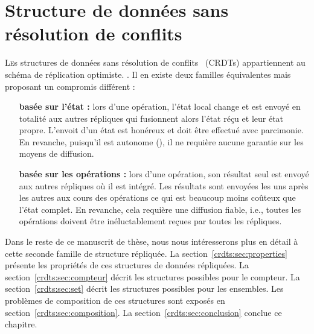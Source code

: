 
\chapter{Structure de données sans résolution de conflits}

\minitoc

\lettrine{L}es structures de données sans résolution de
conflits~\cite{shapiro2011comprehensive} (CRDTs) appartiennent au schéma de
réplication optimiste. .  Il en existe deux
familles équivalentes mais proposant un compromis différent :
\begin{itemize}
\item [\textbf{basée sur l'état :}] lors d'une opération, l'état local change et
  est envoyé en totalité aux autres répliques qui fusionnent alors l'état réçu
  et leur état propre. L'envoit d'un état est honéreux et doit être effectué
  avec parcimonie. En revanche, puisqu'il est autonome
  (), il ne requière aucune garantie sur les moyens
  de diffusion.
\item [\textbf{basée sur les opérations :}] lors d'une opération, son résultat
  seul est envoyé aux autres répliques où il est intégré. Les résultats sont
  envoyées les uns après les autres aux cours des opérations ce qui est beaucoup
  moins coûteux que l'état complet. En revanche, cela requière une diffusion
  fiable, i.e., toutes les opérations doivent être inéluctablement reçues par
  toutes les répliques.
\end{itemize}

Dans le reste de ce manuscrit de thèse, nous nous intéresserons plus en détail à
cette seconde famille de structure répliquée. La
section~\ref{crdts:sec:properties} présente les propriétés de ces structures de
données répliquées. La section~\ref{crdts:sec:compteur} décrit les structures
possibles pour le compteur. La section~\ref{crdts:sec:set} décrit les structures
possibles pour les ensembles. Les problèmes de composition de ces structures
sont exposés en section~\ref{crdts:sec:composition}. La
section~\ref{crdts:sec:conclusion} conclue ce chapitre.


